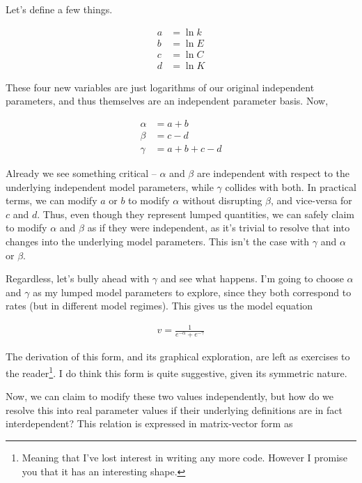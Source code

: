 \documentclass{article}
\begin{document}
Let's define a few things.

\begin{align}
a &= \ln k
\\ b &= \ln E
\\ c &= \ln C
\\ d &= \ln K
\end{align}

These four new variables are just logarithms of our original independent parameters, and thus themselves are an independent parameter basis.  Now,

\begin{align}
\alpha &= a + b
\\ \beta &= c - d
\\ \gamma &= a + b + c -d
\end{align}

Already we see something critical -- \(\alpha\) and \(\beta\) are independent with respect to the underlying independent model parameters, while \(\gamma\) collides with both.  In practical terms, we can modify \(a\) or \(b\) to modify \(\alpha\) without disrupting \(\beta\), and vice-versa for \(c\) and \(d\).  Thus, even though they represent lumped quantities, we can safely claim to modify \(\alpha\) and \(\beta\) as if they were independent, as it's trivial to resolve that into changes into the underlying model parameters.  This isn't the case with \(\gamma\) and \(\alpha\) or \(\beta\).

Regardless, let's bully ahead with \(\gamma\) and see what happens.  I'm going to choose \(\alpha\) and \(\gamma\) as my lumped model parameters to explore, since they both correspond to rates (but in different model regimes).  This gives us the model equation

\begin{align}
v = \frac{1}{e^{-\alpha} + e^{-\gamma}}
\end{align}

The derivation of this form, and its graphical exploration, are left as exercises to the reader\footnote{Meaning that I've lost interest in writing any more code.  However I promise you that it has an interesting shape.}.  I do think this form is quite suggestive, given its symmetric nature.

Now, we can claim to modify these two values independently, but how do we resolve this into real parameter values if their underlying definitions are in fact interdependent?  This relation is expressed in matrix-vector form as
\end{document}
